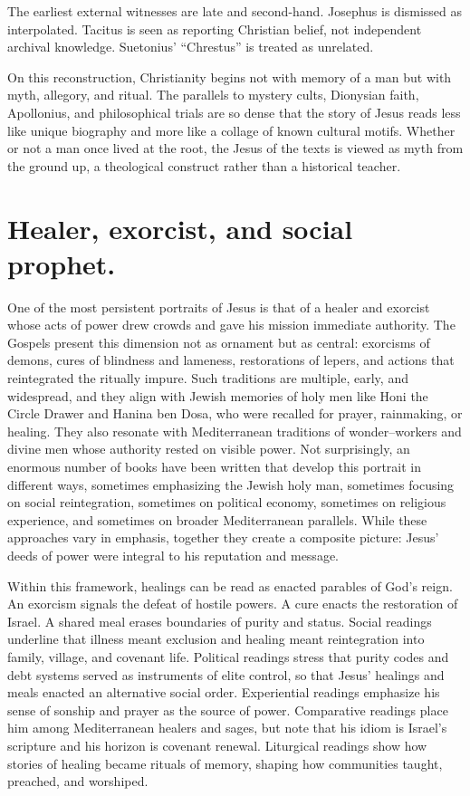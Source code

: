 The earliest external witnesses are late and second-hand.
Josephus is dismissed as interpolated.
Tacitus is seen as reporting Christian belief, not independent archival knowledge.
Suetonius’ “Chrestus” is treated as unrelated.

On this reconstruction, Christianity begins not with memory of a man but with myth, allegory, and ritual.
The parallels to mystery cults, Dionysian faith, Apollonius, and philosophical trials are so dense that the story of Jesus reads less like unique biography and more like a collage of known cultural motifs.
Whether or not a man once lived at the root, the Jesus of the texts is viewed as myth from the ground up, a theological construct rather than a historical teacher.

\section{Healer, exorcist, and social prophet.}\label{sec:healer}

One of the most persistent portraits of Jesus is that of a healer and exorcist whose acts of power drew crowds and gave his mission immediate authority.
The Gospels present this dimension not as ornament but as central: exorcisms of demons, cures of blindness and lameness, restorations of lepers, and actions that reintegrated the ritually impure.
Such traditions are multiple, early, and widespread, and they align with Jewish memories of holy men like Honi the Circle Drawer and Hanina ben Dosa, who were recalled for prayer, rainmaking, or healing.
They also resonate with Mediterranean traditions of wonder–workers and divine men whose authority rested on visible power.
Not surprisingly, an enormous number of books have been written that develop this portrait in different ways, sometimes emphasizing the Jewish holy man, sometimes focusing on social reintegration, sometimes on political economy, sometimes on religious experience, and sometimes on broader Mediterranean parallels.
While these approaches vary in emphasis, together they create a composite picture: Jesus’ deeds of power were integral to his reputation and message.

Within this framework, healings can be read as enacted parables of God’s reign.
An exorcism signals the defeat of hostile powers.
A cure enacts the restoration of Israel.
A shared meal erases boundaries of purity and status.
Social readings underline that illness meant exclusion and healing meant reintegration into family, village, and covenant life.
Political readings stress that purity codes and debt systems served as instruments of elite control, so that Jesus’ healings and meals enacted an alternative social order.
Experiential readings emphasize his sense of sonship and prayer as the source of power.
Comparative readings place him among Mediterranean healers and sages, but note that his idiom is Israel’s scripture and his horizon is covenant renewal.
Liturgical readings show how stories of healing became rituals of memory, shaping how communities taught, preached, and worshiped.

